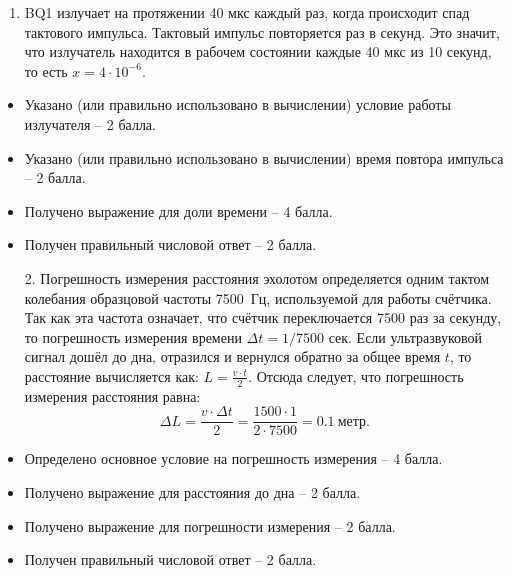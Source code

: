 \solutionSection

\begin{enumerate}
    \item BQ1 излучает на протяжении 40 мкс каждый раз, 
    когда происходит спад тактового импульса. Тактовый 
    импульс повторяется раз в  секунд. Это значит, 
    что излучатель находится в рабочем состоянии каждые 
    40 мкс из 10 секунд, то есть $x = 4\cdot 10^{-6}$.
    
\end{enumerate}

\additionalCriteria

\begin{itemize}
    \item Указано (или правильно использовано в вычислении)  условие работы излучателя – 2 балла.
    \item Указано (или правильно использовано в вычислении) время повтора импульса – 2 балла.
    \item Получено выражение для доли времени – 4 балла.
    \item Получен правильный числовой ответ – 2 балла.
\end{itemize}

\begin{enumerate}
    \item[2.] Погрешность измерения расстояния эхолотом 
    определяется одним тактом колебания образцовой частоты 
    7500~Гц, используемой для работы счётчика. Так как эта 
    частота означает, что счётчик переключается 7500 раз за 
    секунду, то погрешность измерения времени $\Delta t = 1/7500$ сек. 
    Если ультразвуковой сигнал дошёл до дна, отразился и 
    вернулся обратно за общее время $t$, то расстояние 
    вычисляется как: $L=\frac{v\cdot t}{2}$. Отсюда следует, 
    что погрешность измерения расстояния равна:  $$\Delta L=\frac{v\cdot \Delta t}{2}=\frac{1500\cdot 1}{2\cdot 7500}= 0.1 \: \text{метр}.$$
    
\end{enumerate}

\additionalCriteria

\begin{itemize}
    \item Определено основное условие на погрешность измерения  – 4 балла.
    \item Получено выражение для расстояния до дна – 2 балла.
    \item Получено выражение для погрешности измерения – 2 балла.
    \item Получен правильный числовой ответ – 2 балла.
\end{itemize}

